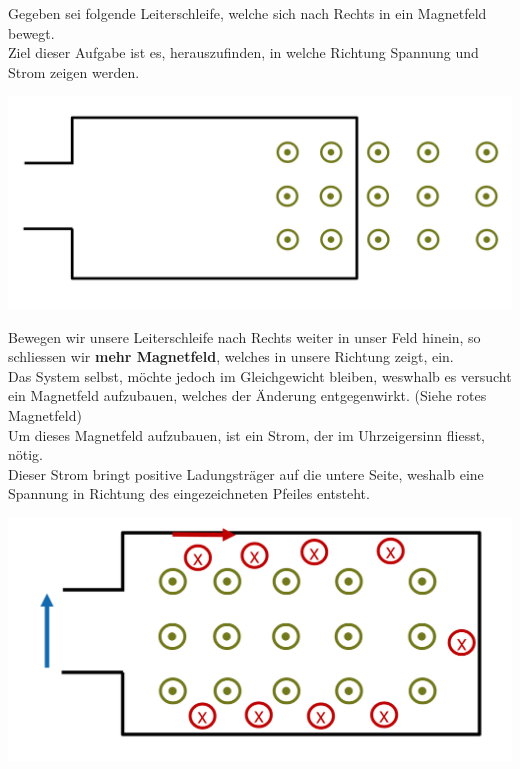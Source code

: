 \beginbsp
Gegeben sei folgende Leiterschleife, welche sich nach Rechts in ein Magnetfeld bewegt. \\
Ziel dieser Aufgabe ist es, herauszufinden, in welche Richtung Spannung und Strom zeigen werden.
\begin{center}
  \includegraphics[scale=0.2]{img/ex-lenzsche-regel}
\end{center}

Bewegen wir unsere Leiterschleife nach Rechts weiter in unser Feld hinein, so schliessen wir \textbf{mehr Magnetfeld}, welches in unsere Richtung zeigt, ein. \\
Das System selbst, möchte jedoch im Gleichgewicht bleiben, weswhalb es versucht ein Magnetfeld aufzubauen, welches der Änderung entgegenwirkt. (Siehe rotes Magnetfeld) \\
Um dieses Magnetfeld aufzubauen, ist ein Strom, der im Uhrzeigersinn fliesst, nötig. \\
Dieser Strom bringt positive Ladungsträger auf die untere Seite, weshalb eine Spannung in Richtung des eingezeichneten Pfeiles entsteht.


\begin{center}

  \includegraphics[scale=0.2]{img/ex-lenzsche-r-sol}
\end{center}
\iend

